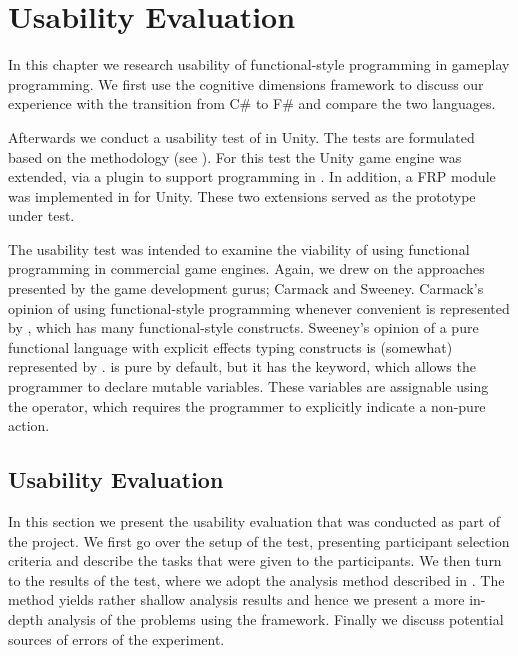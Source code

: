 \chapter{Usability Evaluation}
In this chapter we research usability of functional-style programming in gameplay programming. We first use the cognitive dimensions framework to discuss our experience with the transition from C\# to F\# and compare the two languages.

Afterwards we conduct a usability test of \fs in Unity. The tests are formulated based on the \champagne methodology (see ). For this test the Unity game engine was extended, via a plugin to support programming in \fs\cite{fsharp2019plugin}. In addition, a \gls{FRP} module was implemented in \fs for Unity. These two extensions served as the prototype under test.%

The usability test was intended to examine the viability of using functional programming in commercial game engines. Again, we drew on the approaches presented by the game development gurus; Carmack and Sweeney. Carmack's opinion of using functional-style programming whenever convenient is represented by \cs, which has many functional-style constructs. Sweeney's opinion of a pure functional language with explicit effects typing constructs is (somewhat) represented by \fs. \fs is pure by default, but it has the  keyword, which allows the programmer to declare mutable variables. These variables are assignable using the \ttt{\textless-} operator, which requires the programmer to explicitly indicate a non-pure action.


\section{Usability Evaluation}
In this section we present the usability evaluation that was conducted as part of the project. We first go over the setup of the test, presenting participant selection criteria and describe the tasks that were given to the participants. We then turn to the results of the test, where we adopt the analysis method described in \champagne\cite{blackwell2004champagne}. The \champagne method yields rather shallow analysis results and hence we present a more in-depth analysis of the problems using the \cognitive framework. Finally we discuss potential sources of errors of the experiment.




